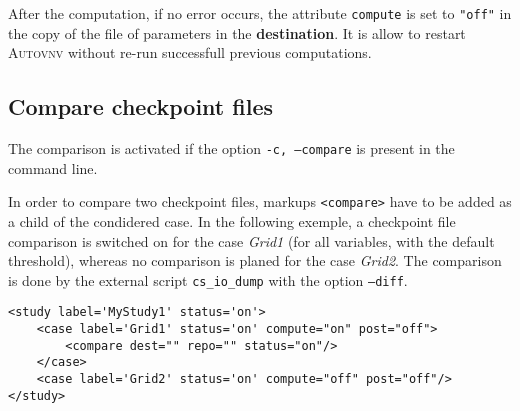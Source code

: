 \documentclass[a4paper,10pt,twoside]{csshortdoc}
\begin{document}
After the computation, if no error occurs, the attribute \texttt{compute} is set
to \texttt{"off"} in the copy of the file of parameters in the
\textbf{destination}. It is allow to restart \textsc{Autovnv} without re-run
successfull previous computations.

\subsection{Compare checkpoint files}

The comparison is activated if the option \texttt{-c, --compare} is present in
the command line.

In order to compare two checkpoint files, markups \texttt{<compare>} have to
be added as a child of the condidered case. In the following exemple, a
checkpoint file comparison is switched on for the case \textit{Grid1} (for all
variables, with the default threshold), whereas no comparison is planed for
the case \textit{Grid2}. The comparison is done by the external
script \texttt{cs\_io\_dump} with the option \texttt{--diff}.

\small
\begin{verbatim}
<study label='MyStudy1' status='on'>
    <case label='Grid1' status='on' compute="on" post="off">
        <compare dest="" repo="" status="on"/>
    </case>
    <case label='Grid2' status='on' compute="off" post="off"/>
</study>
\end{verbatim}
\normalsize
\end{document}
